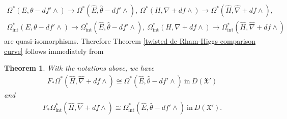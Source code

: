 \documentclass[12pt, a4paper]{article}
\newtheorem{theorem}{Theorem}[section]
\begin{document}
$$
\begin{array}{c}
\Omega^*(E,\theta-df'\wedge)\to\Omega^*(\hat E,\hat\theta-df'\wedge),~\Omega^*(H,\nabla+df\wedge)\to\Omega^*(\hat H,\hat\nabla+df\wedge),\\
\Omega_\mathrm{int}^*(E,\theta-df'\wedge)\to\Omega_\mathrm{int}^*(\hat E,\hat\theta-df'\wedge),~\Omega_\mathrm{int}^*(H,\nabla+df\wedge)\to\Omega_\mathrm{int}^*(\hat H,\hat\nabla+df\wedge)
\end{array}
$$
are quasi-isomorphisms. Therefore Theorem \ref{twisted de Rham-Higgs comparison curve} follows immediately from \fi
\begin{theorem}\label{formal de Rham-Higgs isolated}
With the notations above, we have
\begin{eqnarray}\label{formal log}
F_*\Omega^*(\hat H,\hat\nabla+df\wedge)\cong\Omega^*(\hat E,\hat\theta-df'\wedge)~\mathrm{in}~D(\mathfrak X')
\end{eqnarray}
and
\begin{eqnarray}\label{formal int}
F_*\Omega_\mathrm{int}^*(\hat H,\hat\nabla+df\wedge)\cong\Omega_\mathrm{int}^*(\hat E,\hat\theta-df'\wedge)~\mathrm{in}~D(\mathfrak X').\end{eqnarray}
\end{theorem}
\end{document}
